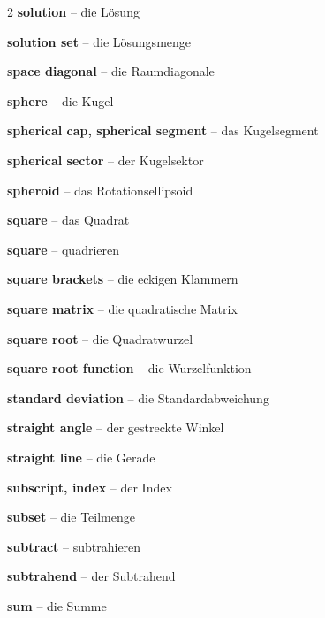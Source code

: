 \begin{multicols}{2}
\textbf{solution} -- die Lösung\dotfill\hyperref[e:78]{\pageref*{e:78}}\par
\textbf{solution set} -- die Lösungsmenge\dotfill\hyperref[e:79]{\pageref*{e:79}}\par
\textbf{space diagonal} -- die Raumdiagonale\dotfill\hyperref[e:252]{\pageref*{e:252}}\par
\textbf{sphere} -- die Kugel\dotfill\hyperref[e:232]{\pageref*{e:232}}\par
\textbf{spherical cap, spherical segment} -- das Kugelsegment\dotfill\hyperref[e:240]{\pageref*{e:240}}\par
\textbf{spherical sector} -- der Kugelsektor\dotfill\hyperref[e:241]{\pageref*{e:241}}\par
\textbf{spheroid} -- das Rotationsellipsoid\dotfill\hyperref[e:242]{\pageref*{e:242}}\par
\textbf{square} -- das Quadrat\dotfill\hyperref[e:198]{\pageref*{e:198}}\par
\textbf{square} -- quadrieren\dotfill\hyperref[e:51]{\pageref*{e:51}}\par
\textbf{square brackets} -- die eckigen Klammern\dotfill\hyperref[e:89]{\pageref*{e:89}}\par
\textbf{square matrix} -- die quadratische Matrix\dotfill\hyperref[e:321]{\pageref*{e:321}}\par
\textbf{square root} -- die Quadratwurzel\dotfill\hyperref[e:45]{\pageref*{e:45}}\par
\textbf{square root function} -- die Wurzelfunktion\dotfill\hyperref[e:128]{\pageref*{e:128}}\par
\textbf{standard deviation} -- die Standardabweichung\dotfill\hyperref[e:337]{\pageref*{e:337}}\par
\textbf{straight angle} -- der gestreckte Winkel\dotfill\hyperref[e:160]{\pageref*{e:160}}\par
\textbf{straight line} -- die Gerade\dotfill\hyperref[e:147]{\pageref*{e:147}}\par
\textbf{subscript, index} -- der Index\dotfill\hyperref[e:4]{\pageref*{e:4}}\par
\textbf{subset} -- die Teilmenge\dotfill\hyperref[e:98]{\pageref*{e:98}}\par
\textbf{subtract} -- subtrahieren\dotfill\hyperref[e:17]{\pageref*{e:17}}\par
\textbf{subtrahend} -- der Subtrahend\dotfill\hyperref[e:20]{\pageref*{e:20}}\par
\textbf{sum} -- die Summe\dotfill\hyperref[e:15]{\pageref*{e:15}}\par

\end{multicols}
